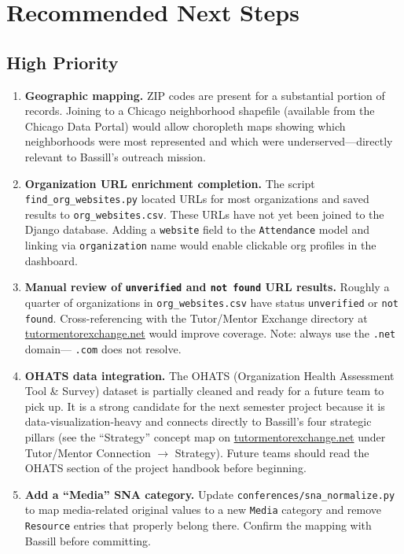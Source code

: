 \documentclass[12pt]{article}
\begin{document}
\section{Recommended Next Steps}

\subsection{High Priority}

\begin{enumerate}[leftmargin=1.5em]
  \item \textbf{Geographic mapping.}
        ZIP codes are present for a substantial portion of records. Joining
        to a Chicago neighborhood shapefile (available from the Chicago
        Data Portal) would allow choropleth maps showing which neighborhoods
        were most represented and which were underserved---directly relevant
        to Bassill's outreach mission.

  \item \textbf{Organization URL enrichment completion.}
        The script \texttt{find\_org\_websites.py} located URLs for most
        organizations and saved results to \texttt{org\_websites.csv}. These
        URLs have not yet been joined to the Django database. Adding a
        \texttt{website} field to the \texttt{Attendance} model and linking
        via \texttt{organization} name would enable clickable org profiles
        in the dashboard.

  \item \textbf{Manual review of \texttt{unverified} and
        \texttt{not found} URL results.}
        Roughly a quarter of organizations in \texttt{org\_websites.csv}
        have status \texttt{unverified} or \texttt{not found}. Cross-referencing
        with the Tutor/Mentor Exchange directory at
        \href{https://tutormentorexchange.net}{tutormentorexchange.net}
        would improve coverage. Note: always use the \texttt{.net} domain---
        \texttt{.com} does not resolve.

  \item \textbf{OHATS data integration.}
        The OHATS (Organization Health Assessment Tool \& Survey) dataset is
        partially cleaned and ready for a future team to pick up. It is a
        strong candidate for the next semester project because it is
        data-visualization-heavy and connects directly to Bassill's four
        strategic pillars (see the ``Strategy'' concept map on
        \href{https://tutormentorexchange.net}{tutormentorexchange.net} under
        Tutor/Mentor Connection $\to$ Strategy). Future teams should read the
        OHATS section of the project handbook before beginning.

  \item \textbf{Add a ``Media'' SNA category.}
        Update \texttt{conferences/sna\_normalize.py} to map media-related
        original values to a new \texttt{Media} category and remove
        \texttt{Resource} entries that properly belong there. Confirm
        the mapping with Bassill before committing.
\end{enumerate}
\end{document}
